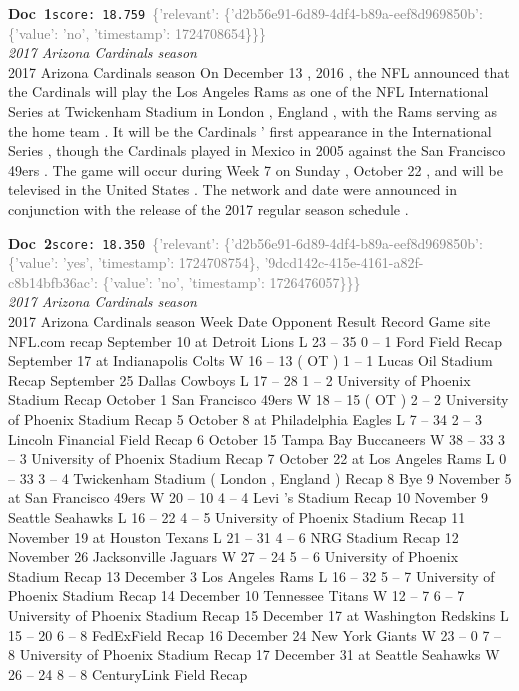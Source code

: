 \documentclass[a4paper,11pt]{article}
\begin{document}
\begin{docenv}
{\footnotesize\textcolor{doccolor}{\textbf{Doc~1}}}\hfill{\tiny\texttt{score:~18.759}}\ {\tiny\textcolor{gray}{\{'relevant': \{'d2b56e91-6d89-4df4-b89a-eef8d969850b': \{'value': 'no', 'timestamp': 1724708654\}\}\}}}\\[3pt]
{\small\textit{2017 Arizona Cardinals season}}\\[2pt]
\vspace{2pt}
{\footnotesize 2017 Arizona Cardinals season
On December 13 , 2016 , the NFL announced that the Cardinals will play the Los Angeles Rams as one of the NFL International Series at Twickenham Stadium in London , England , with the Rams serving as the home team . It will be the Cardinals ' first appearance in the International Series , though the Cardinals played in Mexico in 2005 against the San Francisco 49ers . The game will occur during Week 7 on Sunday , October 22 , and will be televised in the United States . The network and date were announced in conjunction with the release of the 2017 regular season schedule .}
\end{docenv}
\begin{docenv}
{\footnotesize\textcolor{doccolor}{\textbf{Doc~2}}}\hfill{\tiny\texttt{score:~18.350}}\ {\tiny\textcolor{gray}{\{'relevant': \{'d2b56e91-6d89-4df4-b89a-eef8d969850b': \{'value': 'yes', 'timestamp': 1724708754\}, '9dcd142c-415e-4161-a82f-c8b14bfb36ac': \{'value': 'no', 'timestamp': 1726476057\}\}\}}}\\[3pt]
{\small\textit{2017 Arizona Cardinals season}}\\[2pt]
\vspace{2pt}
{\footnotesize 2017 Arizona Cardinals season
Week Date Opponent Result Record Game site NFL.com recap September 10 at Detroit Lions L 23 -- 35 0 -- 1 Ford Field Recap September 17 at Indianapolis Colts W 16 -- 13 ( OT ) 1 -- 1 Lucas Oil Stadium Recap September 25 Dallas Cowboys L 17 -- 28 1 -- 2 University of Phoenix Stadium Recap October 1 San Francisco 49ers W 18 -- 15 ( OT ) 2 -- 2 University of Phoenix Stadium Recap 5 October 8 at Philadelphia Eagles L 7 -- 34 2 -- 3 Lincoln Financial Field Recap 6 October 15 Tampa Bay Buccaneers W 38 -- 33 3 -- 3 University of Phoenix Stadium Recap 7 October 22 at Los Angeles Rams L 0 -- 33 3 -- 4 Twickenham Stadium ( London , England ) Recap 8 Bye 9 November 5 at San Francisco 49ers W 20 -- 10 4 -- 4 Levi 's Stadium Recap 10 November 9 Seattle Seahawks L 16 -- 22 4 -- 5 University of Phoenix Stadium Recap 11 November 19 at Houston Texans L 21 -- 31 4 -- 6 NRG Stadium Recap 12 November 26 Jacksonville Jaguars W 27 -- 24 5 -- 6 University of Phoenix Stadium Recap 13 December 3 Los Angeles Rams L 16 -- 32 5 -- 7 University of Phoenix Stadium Recap 14 December 10 Tennessee Titans W 12 -- 7 6 -- 7 University of Phoenix Stadium Recap 15 December 17 at Washington Redskins L 15 -- 20 6 -- 8 FedExField Recap 16 December 24 New York Giants W 23 -- 0 7 -- 8 University of Phoenix Stadium Recap 17 December 31 at Seattle Seahawks W 26 -- 24 8 -- 8 CenturyLink Field Recap}
\end{docenv}
\end{document}
